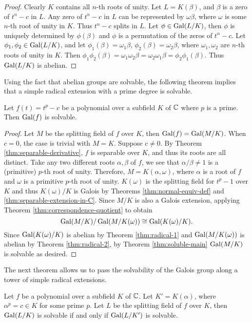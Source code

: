 \begin{proof}
	Clearly $K$ contains all $n$-th roots of unity. Let $L = K(\beta)$, and $\beta$ is a zero of $t^n-c$ in $L$. Any zero of $t^n-c$ in $L$ can be represented by $\omega \beta$, where $\omega$ is some $n$-th root of unity in $K$. Thus $t^n - c$ splits in $L$.  Let $\phi \in \operatorname{Gal}(L / K)$, then $\phi$ is uniquely determined by $\phi(\beta)$ and $\phi$ is a permutation of the zeros of $t^n - c$. Let $\phi_1, \phi_2 \in \operatorname{Gal}(L / K)$, and let $\phi_1(\beta) = \omega_1\beta$, $\phi_2(\beta) = \omega_2\beta$, where $\omega_1, \omega_2$ are $n$-th roots of unity in $K$. Then
	$
	\phi_1 \phi_2(\beta)=\omega_1 \omega_2 \beta=\omega_2 \omega_1  \beta=\phi_2 \phi_1(\beta).
	$
	Thus $\operatorname{Gal}(L / K)$ is abelian.
\end{proof}
Using the fact that abelian groups are solvable, the following theorem implies that a simple radical extension with a prime degree is solvable. 
\begin{theorem} \label{thm:radical-simple-solvable}
	Let $f(t) = t^p - c$ be a polynomial over a subfield $K$ of $\mathbb C$ where $p$ is a prime. Then $\operatorname{Gal}(f)$ is solvable. 
\end{theorem}
\begin{proof}
	Let $M$ be the splitting field of $f$ over $K$, then $\operatorname{Gal}(f) = \operatorname{Gal}(M / K)$. 
	When $c = 0$, the case is trivial with $M = K$. Suppose $c \neq 0$. By Theorem \ref{thm:separable-derivative}, $f$ is separable over $K$, and thus its roots are all distinct. Take any two different roots $\alpha, \beta$ of $f$, we see that $\alpha / \beta \neq 1$ is a (primitive) $p$-th root of unity. Therefore, $M = K(\alpha, \omega)$, where $\alpha$ is a root of $f$ and $\omega$ is a primitive $p$-th root of unity. $K(\omega)$ is the splitting field for $t^p - 1$ over $K$ and thus $K(\omega) / K$ is Galois by Theorems \ref{thm:normal-equiv-def} and \ref{thm:separable-extension-in-C}.  Since $M / K$ is also a Galois extension, applying Theorem \ref{thm:correspondence-quotient} to obtain $$\operatorname{Gal}(M / K) / \operatorname{Gal}(M / K(\omega)) \cong \operatorname{Gal}(K(\omega) / K). $$
	Since $\operatorname{Gal}(K(\omega)/K)$ is abelian by Theorem \ref{thm:radical-1} and $\operatorname{Gal}(M / K(\omega))$ is abelian by Theorem \ref{thm:radical-2}, by Theorem \ref{thm:soluble-main} $\operatorname{Gal}(M/K)$ is solvable as desired. 
\end{proof}

The next theorem allows us to pass the solvability of the Galois group along a tower of simple radical extensions. 

\begin{theorem} \label{thm:solvable:chain}
	Let $f$ be a polynomial over a subfield $K$ of $\mathbb C$. Let $K' = K(\alpha)$, where $\alpha^p = c \in K$ for some prime $p$. Let $L$ be the splitting field of $f$ over $K$, then $\operatorname{Gal}(L/K)$ is solvable if and only if $\operatorname{Gal}(L / K')$ is solvable. 
\end{theorem}

